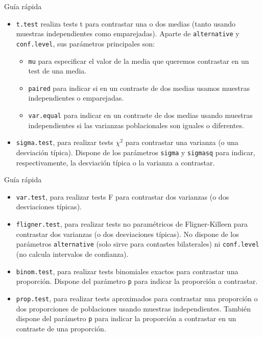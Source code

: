 \documentclass[
  ignorenonframetext,
]{beamer}
\begin{document}
\begin{frame}[fragile]{Guía rápida}
\protect\hypertarget{guuxeda-ruxe1pida-1}{}
\begin{itemize}
\item
  \texttt{t.test} realiza tests t para contrastar una o dos medias
  (tanto usando muestras independientes como emparejadas). Aparte de
  \texttt{alternative} y \texttt{conf.level}, sus parámetros principales
  son:

  \begin{itemize}
  \item
    \texttt{mu} para especificar el valor de la media que queremos
    contrastar en un test de una media.
  \item
    \texttt{paired} para indicar si en un contraste de dos medias usamos
    muestras independientes o emparejadas.
  \item
    \texttt{var.equal} para indicar en un contraste de dos medias usando
    muestras independientes si las varianzas poblacionales son iguales o
    diferentes.
  \end{itemize}
\item
  \texttt{sigma.test}, para realizar tests \(\chi^2\) para contrastar
  una varianza (o una desviación típica). Dispone de los parámetros
  \texttt{sigma} y \texttt{sigmasq} para indicar, respectivamente, la
  desviación típica o la varianza a contrastar.
\end{itemize}
\end{frame}

\begin{frame}[fragile]{Guía rápida}
\protect\hypertarget{guuxeda-ruxe1pida-2}{}
\begin{itemize}
\item
  \texttt{var.test}, para realizar tests F para contrastar dos varianzas
  (o dos desviaciones típicas).
\item
  \texttt{fligner.test}, para realizar tests no paramétricos de
  Fligner-Killeen para contrastar dos varianzas (o dos desviaciones
  típicas). No dispone de los parámetros \texttt{alternative} (solo
  sirve para contastes bilaterales) ni \texttt{conf.level} (no calcula
  intervalos de confianza).
\item
  \texttt{binom.test}, para realizar tests binomiales exactos para
  contrastar una proporción. Dispone del parámetro \texttt{p} para
  indicar la proporción a contrastar.
\item
  \texttt{prop.test}, para realizar tests aproximados para contrastar
  una proporción o dos proporciones de poblaciones usando muestras
  independientes. También dispone del parámetro \texttt{p} para indicar
  la proporción a contrastar en un contraste de una proporción.
\end{itemize}
\end{frame}
\end{document}

